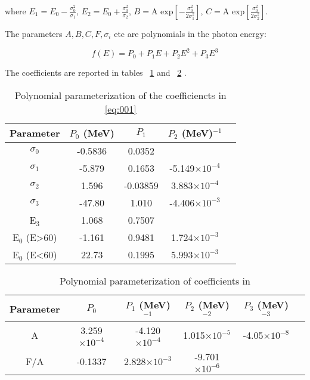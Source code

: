 where $E_1=E_0 - \frac{\sigma_0^2}{\sigma_1}$, $E_2 =E_0 + \frac{\sigma_0^2}{\sigma_2}$,
 $B=\text{A exp}\left[-\frac{\sigma_0^2}{2\sigma_1^2}\right]$, 
 $C=\text{A exp}\left[\frac{\sigma_0^2}{2\sigma_2^2}\right]$. 

 The parameters $A, B ,C , F, \sigma_i$  etc are polynomials in the photon energy:
 
\begin{equation}
  f(E)= P_0+P_1E+P_2E^2+P_3E^3
\end{equation}

The coefficients are reported in tables ~\ref{tab:coefficients1} and ~\ref{tab:coefficients2} .

\begin{table}[!h]
\begin{center}
\begin{tabular}{| c | c | c | c | c | }
\hline
Parameter & $P_0$ (MeV)& $P_1$ & $P_2$ (MeV)$^{-1}$ \\ \hline
$\sigma_0$ & -0.5836 & 0.0352 & \\ \hline
$\sigma_1$ & -5.879 & 0.1653 & -5.149$\times 10^{-4}$ \\ \hline
$\sigma_2$ & 1.596 & -0.03859 & 3.883$\times 10^{-4}$ \\ \hline
$\sigma_3$ & -47.80 & 1.010 & -4.406$\times 10^{-3}$ \\ \hline
E$_3$ & 1.068 & 0.7507 & \\ \hline
E$_0$ (E>60) & -1.161 & 0.9481 & 1.724$\times 10^{-3}$ \\ \hline
E$_0$ (E<60) & 22.73 & 0.1995 & 5.993$\times 10^{-3}$ \\ \hline

\end{tabular}
\end{center}
\caption{
  Polynomial parameterization of the coefficiencts in \ref{eq:001}
  \label{tab:coefficients1}}
\end{table}

\begin{table}[!h]
\begin{center}
\begin{tabular}{| c | c | c | c | c | c |}
\hline
Parameter & $P_0$ & $P_1$ (MeV)$^{-1}$ & $P_2$ (MeV)$^{-2}$  & $P_3$ (MeV)$^{-3}$\\ \hline
A & 3.259$\times 10^{-4}$ & -4.120$\times 10^{-4}$ & 1.015$\times 10^{-5}$ & -4.05$\times 10^{-8}$  \\ \hline
F/A & -0.1337 & 2.828$\times 10^{-3}$ & -9.701$\times 10^{-6}$ & \\ \hline
\end{tabular}
\end{center}
\caption{Polynomial parameterization of coefficients in \label{tab:coefficients2}}
\end{table}

